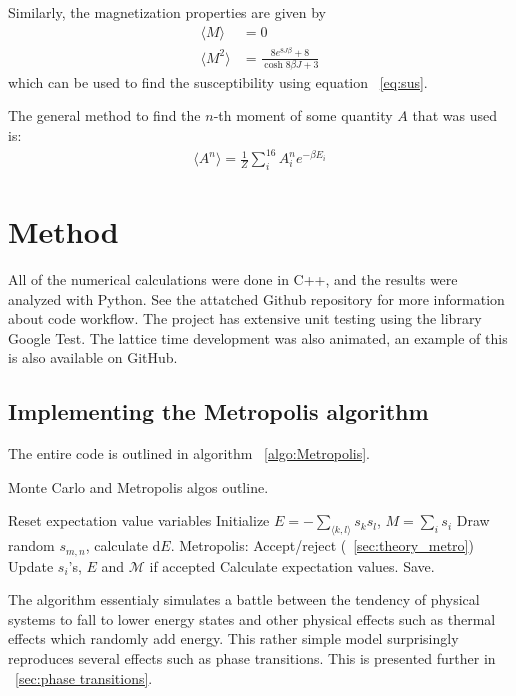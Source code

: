 \documentclass[aps,reprint]{revtex4-1}
\newcommand{\mean}[1]{\langle #1 \rangle}
\begin{document}
Similarly, the magnetization properties are given by
\begin{align*}
  \mean{M} &= 0 \\
  \mean{M^2} &= \frac{8e^{8 J \beta} + 8}{\cosh{8\beta J} + 3}
\end{align*}
which can be used to find the susceptibility using equation ~\ref{eq:sus}.

The general method to find the $n$-th moment of some quantity $A$ that was
used is:
\begin{align*}
  \mean{A^n} = \frac{1}{Z} \sum_i^{16} A_i^n e^{-\beta E_i}
\end{align*}

\section{Method} \label{sec:method}
All of the numerical calculations were done in C++, and the results were analyzed
with Python. See the attatched Github repository for more information about code workflow.
The project has extensive unit testing using the library Google Test. The lattice time
development was also animated, an example of this is also available on GitHub.
\subsection{Implementing the Metropolis algorithm}
The entire code is outlined in algorithm ~\ref{algo:Metropolis}.
\begin{algorithm}[H]
  \caption{Monte Carlo and Metropolis algos outline.}
  \label{algo:Metropolis}
   \begin{algorithmic}[1]
        \State Reset expectation value variables
        \State Initialize $E = -\sum_{\mean{k,l}}s_k s_l$, $M = \sum_i s_i$
            \State Draw random $s_{m,n}$, calculate d$E$.
            \State Metropolis: Accept/reject (~\ref{sec:theory_metro})
            \State Update $s_i$'s, $E$ and $\mathcal M$ if accepted
          \EndFor
        \EndFor
        \State Calculate expectation values. Save.
     \EndFor
   \end{algorithmic}
\end{algorithm}
The algorithm essentialy simulates a battle between the tendency of physical systems
to fall to lower energy states and other physical effects such as thermal
effects which randomly add energy. This rather simple model surprisingly
reproduces several effects such as phase transitions. This is presented further in
~\ref{sec:phase transitions}.
\end{document}
